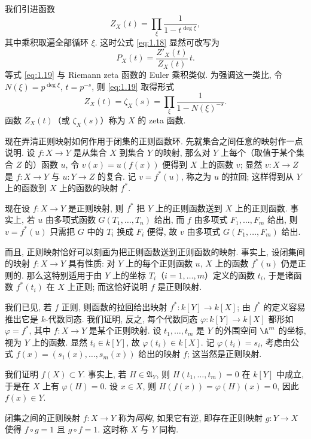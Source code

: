\begin{example}
	我们引进函数
	\begin{equation}
		\label{eq:1.19}
		Z_X(t) = \prod_{\xi} \frac{1}{1 - t^{\deg \xi}},
	\end{equation}
	其中乘积取遍全部循环 $\xi$. 这时公式 \eqref{eq:1.18} 显然可改写为
	\[
		P_X(t) = \frac{Z'_X(t)}{Z_X(t)}\, t.
	\]
	等式 \eqref{eq:1.19} 与 Riemann zeta 函数的 Euler 乘积类似. 为强调这一类比, 令 $N(\xi) = p^{\deg \xi}$, $t = p^{-s}$, 则 \eqref{eq:1.19} 取得形式
	\[
		Z_X(t) = \zeta_X(s) = \prod_{\xi} \frac{1}{1 - N(\xi)^{-s}}.
	\]
	函数 $Z_X(t)$（或 $\zeta_X(s)$）称为 $X$ 的 zeta 函数.
\end{example}

现在弄清正则映射如何作用于闭集的正则函数环. 先就集合之间任意的映射作一点说明. 设 $f: X \to Y$ 是从集合 $X$ 到集合 $Y$ 的映射, 那么对 $Y$ 上每个（取值于某个集合 $Z$ 的）函数 $u$, 令 $v(x) = u(f(x))$ 便得到 $X$ 上的函数 $v$; 显然 $v: X \to Z$ 是 $f: X \to Y$ 与 $u: Y \to Z$ 的复合. 记 $v = f^*(u)$, 称之为 $u$ 的拉回; 这样得到从 $Y$ 上的函数到 $X$ 上的函数的映射 $f^*$.

现在设 $f: X \to Y$ 是正则映射, 则 $f^*$ 把 $Y$ 上的正则函数送到 $X$ 上的正则函数. 事实上, 若 $u$ 由多项式函数 $G(T_1, \ldots, T_n)$ 给出, 而 $f$ 由多项式 $F_1, \ldots, F_m$ 给出, 则 $v = f^*(u)$ 只需把 $G$ 中的 $T_i$ 换成 $F_i$ 便得, 故 $v$ 由多项式 $G(F_1, \ldots, F_m)$ 给出.

而且, 正则映射恰好可以刻画为把正则函数送到正则函数的映射. 事实上, 设闭集间的映射 $f: X \to Y$ 具有性质: 对 $Y$ 上的每个正则函数 $u$, $X$ 上的函数 $f^*(u)$ 仍是正则的. 那么这特别适用于由 $Y$ 上的坐标 $T_i$（$i = 1, \ldots, m$）定义的函数 $t_i$, 于是诸函数 $f^*(t_i)$ 在 $X$ 上正则; 而这恰好说明 $f$ 是正则映射.

我们已见, 若 $f$ 正则, 则函数的拉回给出映射 $f^*: k[Y] \to k[X]$; 由 $f^*$ 的定义容易推出它是 $k$-代数同态. 我们证明, 反之, 每个代数同态 $\varphi: k[Y] \to k[X]$ 都形如 $\varphi = f^*$, 其中 $f: X \to Y$ 是某个正则映射. 设 $t_1, \ldots, t_m$ 是 $Y$ 的外围空间 $\A^m$ 的坐标, 视为 $Y$ 上的函数. 显然 $t_i \in k[Y]$, 故 $\varphi(t_i) \in k[X]$. 记 $\varphi(t_i) = s_i$, 考虑由公式 $f(x) = (s_1(x), \ldots, s_m(x))$ 给出的映射 $f$; 这当然是正则映射.

	我们证明 $f(X) \subset Y$. 事实上, 若 $H \in \mathfrak A_Y$, 则 $H(t_1, \ldots, t_m) = 0$ 在 $k[Y]$ 中成立, 于是在 $X$ 上有 $\varphi(H) = 0$. 设 $x \in X$, 则 $H(f(x)) = \varphi(H)(x) = 0$, 因此 $f(x) \in Y$.

\begin{definition}[同构]\label{def:isomorphism}
	闭集之间的正则映射 $f: X \to Y$ 称为\emph{同构}, 如果它有逆, 即存在正则映射 $g: Y \to X$ 使得 $f \circ g = 1$ 且 $g \circ f = 1$. 这时称 $X$ 与 $Y$ 同构.
\end{definition}

